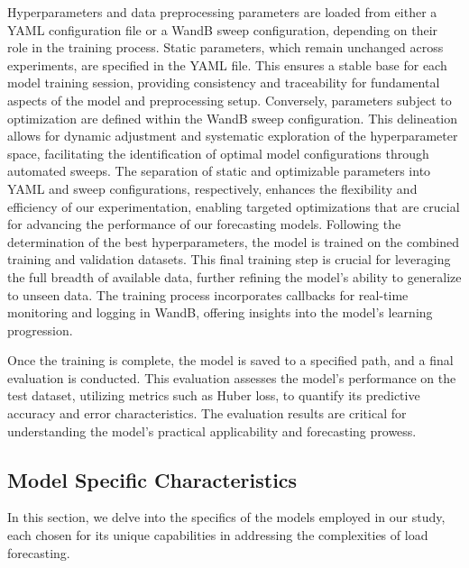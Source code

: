 \documentclass{article} %
\begin{document}
Hyperparameters and data preprocessing parameters are loaded from either a YAML configuration file or a \gls*{WandB} sweep configuration, depending on their role in the training process. Static parameters, which remain unchanged across experiments, are specified in the YAML file. This ensures a stable base for each model training session, providing consistency and traceability for fundamental aspects of the model and preprocessing setup. Conversely, parameters subject to optimization are defined within the \gls*{WandB} sweep configuration. This delineation allows for dynamic adjustment and systematic exploration of the hyperparameter space, facilitating the identification of optimal model configurations through automated sweeps. The separation of static and optimizable parameters into YAML and sweep configurations, respectively, enhances the flexibility and efficiency of our experimentation, enabling targeted optimizations that are crucial for advancing the performance of our forecasting models. 
Following the determination of the best hyperparameters, the model is trained on the combined training and validation datasets. This final training step is crucial for leveraging the full breadth of available data, further refining the model's ability to generalize to unseen data. The training process incorporates callbacks for real-time monitoring and logging in \gls*{WandB}, offering insights into the model's learning progression. 

Once the training is complete, the model is saved to a specified path, and a final evaluation is conducted. This evaluation assesses the model's performance on the test dataset, utilizing metrics such as Huber loss, to quantify its predictive accuracy and error characteristics. The evaluation results are critical for understanding the model's practical applicability and forecasting prowess. 

\subsection{Model Specific Characteristics}

In this section, we delve into the specifics of the models employed in our study, each chosen for its unique capabilities in addressing the complexities of load forecasting. 
\end{document}
